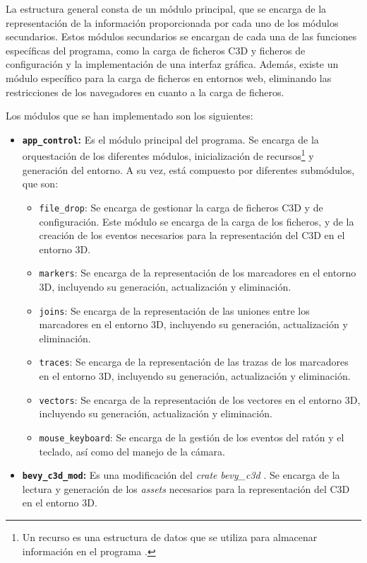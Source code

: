 La estructura general consta de un módulo principal, que se encarga de la representación de la información proporcionada por cada uno de los módulos secundarios. Estos módulos secundarios se encargan de cada una de las funciones específicas del programa, como la carga de ficheros \ac{C3D} y ficheros de configuración y la implementación de una interfaz gráfica. Además, existe un módulo específico para la carga de ficheros en entornos web, eliminando las restricciones de los navegadores en cuanto a la carga de ficheros.

Los módulos que se han implementado son los siguientes:

\begin{itemize}
    \item \textbf{\texttt{app\_control}:} Es el módulo principal del programa. Se encarga de la orquestación de los diferentes módulos, inicialización de recursos\footnote{Un recurso es una estructura de datos que se utiliza para almacenar información en el programa \autocite{Resources,ResourcesUnofficialBevy}.} y generación del entorno. A su vez, está compuesto por diferentes submódulos, que son:
    \begin{itemize}
        \item \texttt{file\_drop}: Se encarga de gestionar la carga de ficheros \ac{C3D} y de configuración. Este módulo se encarga de la carga de los ficheros, y de la creación de los eventos necesarios para la representación del \ac{C3D} en el entorno 3D.
        \item \texttt{markers}: Se encarga de la representación de los marcadores en el entorno 3D, incluyendo su generación, actualización y eliminación.
        \item \texttt{joins}: Se encarga de la representación de las uniones entre los marcadores en el entorno 3D, incluyendo su generación, actualización y eliminación. 
        \item \texttt{traces}: Se encarga de la representación de las trazas de los marcadores en el entorno 3D, incluyendo su generación, actualización y eliminación.
        \item \texttt{vectors}: Se encarga de la representación de los vectores en el entorno 3D, incluyendo su generación, actualización y eliminación.
        \item \texttt{mouse\_keyboard}: Se encarga de la gestión de los eventos del ratón y el teclado, así como del manejo de la cámara.
    \end{itemize}
    \item \textbf{\texttt{bevy\_c3d\_mod}:} Es una modificación del \textit{crate} \textit{bevy\_c3d} \autocite{BiomechanicsfoundationBevy_c3d2024}. Se encarga de la lectura y generación de los \textit{assets} necesarios para la representación del \ac{C3D} en el entorno 3D. 

\end{itemize}
